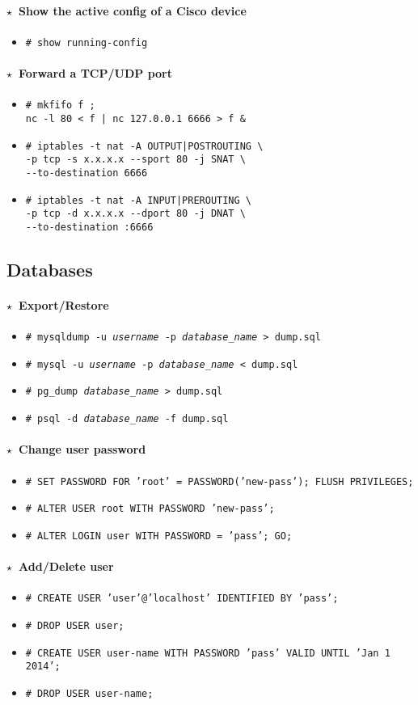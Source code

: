 \documentclass[10pt,landscape]{article}
\newcommand{\os}[1]{\texttt{\footnotesize{#1}}}
\newcommand{\unix}{\os{U}}
\newcommand{\linux}{\os{L}}
\newenvironment{action}[1]
  {\paragraph{$\star$~#1}\begin{itemize}[leftmargin=1cm]}
  {\end{itemize}}
\newcommand{\cmd}[2]{\item[#1] {\small\tt\# #2}}
\newcommand{\app}[1]{\footnotesize\sc{#1}}
\begin{document}
\begin{multicols*}{3}
\newcommand{\cisco}{\app{cisco}}

\begin{action}{Show the active config of a Cisco device}
\cmd{\cisco}{show running-config}
\end{action}

\begin{action}{Forward a TCP/UDP port}
\cmd{\unix}{mkfifo f ;\\
nc -l 80 < f | nc 127.0.0.1 6666 > f \&}
\cmd{\linux}{iptables -t nat -A OUTPUT|POSTROUTING \textbackslash\\
  -p tcp -s x.x.x.x -{}-sport 80 -j SNAT \textbackslash\\
  -{}-to-destination 6666}
\cmd{\linux}{iptables -t nat -A INPUT|PREROUTING \textbackslash\\
  -p tcp -d x.x.x.x -{}-dport 80 -j DNAT \textbackslash\\
  -{}-to-destination :6666}
\end{action}

\subsection*{Databases}

\newcommand{\mysql}{\app{mysql}}
\newcommand{\postgres}{\app{psql}}
\newcommand{\mssql}{\app{mssql}}

\begin{action}{Export/Restore}
\cmd{\unix}{mysqldump -u \emph{username} -p \emph{database\_name} > dump.sql}
\cmd{\unix}{mysql -u \emph{username} -p \emph{database\_name} < dump.sql}
\cmd{\unix}{pg\_dump \emph{database\_name} > dump.sql}
\cmd{\unix}{psql -d \emph{database\_name} -f dump.sql}
\end{action}

\begin{action}{Change user password}
\cmd{\mysql}{SET PASSWORD FOR 'root' = PASSWORD('new-pass'); FLUSH PRIVILEGES;}
\cmd{\postgres}{ALTER USER root WITH PASSWORD 'new-pass';}
\cmd{\mssql}{ALTER LOGIN user WITH PASSWORD = 'pass'; GO;}
\end{action}

\begin{action}{Add/Delete user}
\cmd{\mysql}{CREATE USER 'user'@'localhost' IDENTIFIED BY 'pass';}
\cmd{\mysql}{DROP USER user;}
\cmd{\postgres}{CREATE USER user-name WITH PASSWORD 'pass' VALID UNTIL 'Jan 1 2014';}
\cmd{\postgres}{DROP USER user-name;}
\end{action}


\end{multicols*}
\end{document}
